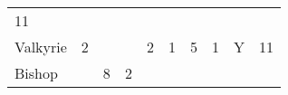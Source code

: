 \documentclass[12pt]{article}
\begin{document}
\begin{longtable}[]{@{}llllllllll@{}}
\begin{minipage}[t]{0.08\columnwidth}\raggedright\strut
11
\strut\end{minipage}\tabularnewline
\begin{minipage}[t]{0.13\columnwidth}\raggedright\strut
Valkyrie
\strut\end{minipage} &
\begin{minipage}[t]{0.06\columnwidth}\raggedright\strut
2
\strut\end{minipage} &
\begin{minipage}[t]{0.06\columnwidth}\raggedright\strut
\strut\end{minipage} &
\begin{minipage}[t]{0.06\columnwidth}\raggedright\strut
\strut\end{minipage} &
\begin{minipage}[t]{0.06\columnwidth}\raggedright\strut
2
\strut\end{minipage} &
\begin{minipage}[t]{0.06\columnwidth}\raggedright\strut
1
\strut\end{minipage} &
\begin{minipage}[t]{0.06\columnwidth}\raggedright\strut
5
\strut\end{minipage} &
\begin{minipage}[t]{0.06\columnwidth}\raggedright\strut
1
\strut\end{minipage} &
\begin{minipage}[t]{0.07\columnwidth}\raggedright\strut
Y
\strut\end{minipage} &
\begin{minipage}[t]{0.08\columnwidth}\raggedright\strut
11
\strut\end{minipage}\tabularnewline
\begin{minipage}[t]{0.13\columnwidth}\raggedright\strut
Bishop
\strut\end{minipage} &
\begin{minipage}[t]{0.06\columnwidth}\raggedright\strut
\strut\end{minipage} &
\begin{minipage}[t]{0.06\columnwidth}\raggedright\strut
8
\strut\end{minipage} &
\begin{minipage}[t]{0.06\columnwidth}\raggedright\strut
2
\strut\end{minipage} &
\begin{minipage}[t]{0.06\columnwidth}\raggedright\strut
\strut\end{minipage} &

\end{longtable}
\end{document}
